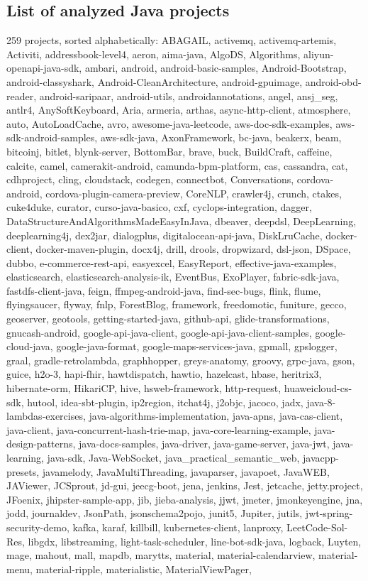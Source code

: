 \documentclass[onecolumn]{article}
\begin{document}
\subsection{List of analyzed Java projects} \label{appendix_list_of_analyzed_java_projects}
259 projects, sorted alphabetically:
ABAGAIL, activemq, activemq-artemis, Activiti, addressbook-level4, aeron, aima-java, AlgoDS, Algorithms, aliyun-openapi-java-sdk, ambari, android, android-basic-samples, Android-Bootstrap, android-classyshark, Android-CleanArchitecture, android-gpuimage, android-obd-reader, android-saripaar, android-utils, androidannotations, angel, ansj\_seg, antlr4, AnySoftKeyboard, Aria, armeria, arthas, async-http-client, atmosphere, auto, AutoLoadCache, avro, awesome-java-leetcode, aws-doc-sdk-examples, aws-sdk-android-samples, aws-sdk-java, AxonFramework, bc-java, beakerx, beam, bitcoinj, bitlet, blynk-server, BottomBar, brave, buck, BuildCraft, caffeine, calcite, camel, camerakit-android, camunda-bpm-platform, cas, cassandra, cat, cdhproject, cling, cloudstack, codegen, connectbot, Conversations, cordova-android, cordova-plugin-camera-preview, CoreNLP, crawler4j, crunch, ctakes, cuke4duke, curator, curso-java-basico, cxf, cyclops-integration, dagger, DataStructureAndAlgorithmsMadeEasyInJava, dbeaver, deepdsl, DeepLearning, deeplearning4j, dex2jar, dialogplus, digitalocean-api-java, DiskLruCache, docker-client, docker-maven-plugin, docx4j, drill, drools, dropwizard, dsl-json, DSpace, dubbo, e-commerce-rest-api, easyexcel, EasyReport, effective-java-examples, elasticsearch, elasticsearch-analysis-ik, EventBus, ExoPlayer, fabric-sdk-java, fastdfs-client-java, feign, ffmpeg-android-java, find-sec-bugs, flink, flume, flyingsaucer, flyway, fnlp, ForestBlog, framework, freedomotic, funiture, gecco, geoserver, geotools, getting-started-java, github-api, glide-transformations, gnucash-android, google-api-java-client, google-api-java-client-samples, google-cloud-java, google-java-format, google-maps-services-java, gpmall, gpslogger, graal, gradle-retrolambda, graphhopper, greys-anatomy, groovy, grpc-java, gson, guice, h2o-3, hapi-fhir, hawtdispatch, hawtio, hazelcast, hbase, heritrix3, hibernate-orm, HikariCP, hive, hsweb-framework, http-request, huaweicloud-cs-sdk, hutool, idea-sbt-plugin, ip2region, itchat4j, j2objc, jacoco, jadx, java-8-lambdas-exercises, java-algorithms-implementation, java-apns, java-cas-client, java-client, java-concurrent-hash-trie-map, java-core-learning-example, java-design-patterns, java-docs-samples, java-driver, java-game-server, java-jwt, java-learning, java-sdk, Java-WebSocket, java\_practical\_semantic\_web, javacpp-presets, javamelody, JavaMultiThreading, javaparser, javapoet, JavaWEB, JAViewer, JCSprout, jd-gui, jeecg-boot, jena, jenkins, Jest, jetcache, jetty.project, JFoenix, jhipster-sample-app, jib, jieba-analysis, jjwt, jmeter, jmonkeyengine, jna, jodd, journaldev, JsonPath, jsonschema2pojo, junit5, Jupiter, jutils, jwt-spring-security-demo, kafka, karaf, killbill, kubernetes-client, lanproxy, LeetCode-Sol-Res, libgdx, libstreaming, light-task-scheduler, line-bot-sdk-java, logback, Luyten, mage, mahout, mall, mapdb, marytts, material, material-calendarview, material-menu, material-ripple, materialistic, MaterialViewPager, 
\end{document}
